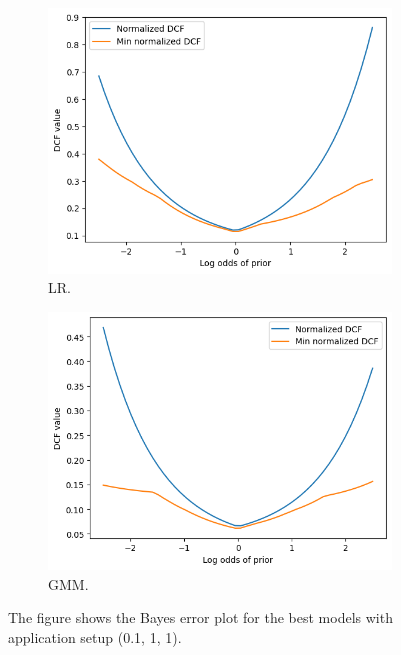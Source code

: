 \documentclass{article}
\begin{document}
\begin{figure}[ht]
    \centering
    \begin{subfigure}[b]{0.3\textwidth}
        \centering
        \includegraphics[width=\textwidth]{images/lr_bayes_error.png}
        \caption{LR.}
    \end{subfigure}
    \hfill
    \hfill
    \begin{subfigure}[b]{0.3\textwidth}
        \centering
        \includegraphics[width=\textwidth]{images/gmm_bayes_error.png}
        \caption{GMM.}
    \end{subfigure}
    \caption{The figure shows the Bayes error plot for the best models with application setup (0.1, 1, 1).}
    \label{fig:models_bayes_error}
\end{figure}
\end{document}
